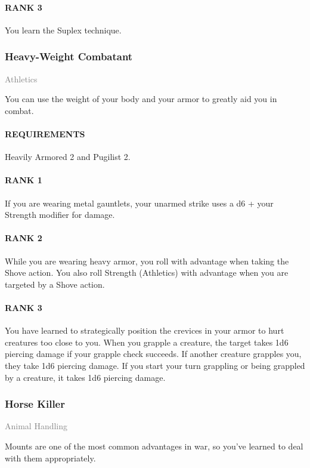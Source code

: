 \paragraph{RANK 3} You learn the Suplex technique.

\subsubsection{Heavy-Weight Combatant} \label{feat::heavyweightcombatant}
\small{\textcolor{gray}{Athletics}}

\normalsize
You can use the weight of your body and your armor to greatly aid you in combat.
\paragraph{REQUIREMENTS} Heavily Armored 2 and Pugilist 2.
\paragraph{RANK 1} If you are wearing metal gauntlets, your unarmed strike uses a d6 + your Strength modifier for damage.
\paragraph{RANK 2} While you are wearing heavy armor, you roll with advantage when taking the Shove action.
You also roll Strength (Athletics) with advantage when you are targeted by a Shove action.
\paragraph{RANK 3} You have learned to strategically position the crevices in your armor to hurt creatures too close to you.
When you grapple a creature, the target takes 1d6 piercing damage if your grapple check succeeds.
If another creature grapples you, they take 1d6 piercing damage.
If you start your turn grappling or being grappled by a creature, it takes 1d6 piercing damage.

\subsubsection{Horse Killer} \label{feat::horsekiller}
\small{\textcolor{gray}{Animal Handling}}

\normalsize
Mounts are one of the most common advantages in war, so you've learned to deal with them appropriately.
